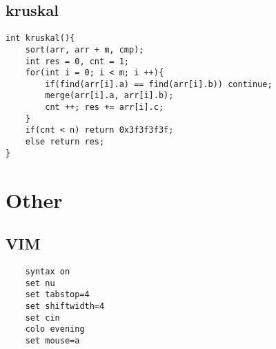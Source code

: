\documentclass[twocolumn,a4]{article}
\begin{document}
\subsection{kruskal}
\begin{lstlisting}
int kruskal(){
    sort(arr, arr + m, cmp);
    int res = 0, cnt = 1;
    for(int i = 0; i < m; i ++){
        if(find(arr[i].a) == find(arr[i].b)) continue;
        merge(arr[i].a, arr[i].b); 
        cnt ++; res += arr[i].c;
    }
    if(cnt < n) return 0x3f3f3f3f;
    else return res;
}
\end{lstlisting}



\section{Other}
\subsection{VIM}
\begin{lstlisting}
    syntax on
    set nu
    set tabstop=4
    set shiftwidth=4
    set cin
    colo evening
    set mouse=a
\end{lstlisting}

\end{document}
